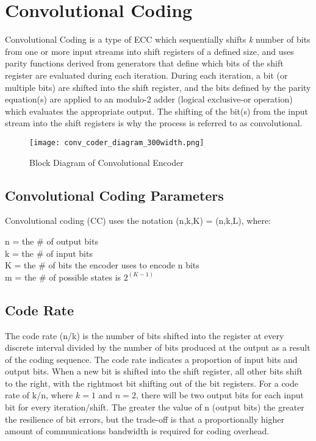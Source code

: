 \documentclass[conference]{IEEEtran}
\begin{document}
\section{Convolutional Coding}
 Convolutional Coding is a type of ECC which sequentially shifts \textit{k} number of bits from one or more input streams into shift registers of a defined size, and uses parity functions derived from generators that define which bits of the shift register are evaluated during each iteration. During each iteration, a bit (or multiple bits) are shifted into the shift register, and the bits defined by the parity equation(s) are applied to an modulo-2 adder (logical exclusive-or operation) which evaluates the appropriate output. The shifting of the bit(s) from the input stream into the shift registers is why the process is referred to as convolutional. 

 \begin{figure}[h]
\centerline{\texttt{[image: conv\_coder\_diagram\_300width.png]}}
\caption{Block Diagram of Convolutional Encoder}
\label{fig:1}
\end{figure}

 \subsection{Convolutional Coding Parameters}
 Convolutional coding (CC) uses the notation (n,k,K) = (n,k,L), where:\\
 \begin{adjustwidth}{1cm}{0cm}
    n = the \# of output bits\\
    k = the \# of input bits\\
    K = the \# of bits the encoder uses to encode n bits\\
    m = the \# of possible states is $2^{(K-1)}$
 \end{adjustwidth}

 \subsection{Code Rate}
 The code rate (n/k) is the number of bits shifted into the register at every discrete interval divided by the number of bits produced at the output as a result of the coding sequence. The code rate indicates a proportion of input bits and output bits. When a new bit is shifted into the shift register, all other bits shift to the right, with the rightmost bit shifting out of the bit registers. For a code rate of k/n, where $k=1$ and $n=2$, there will be two output bits for each input bit for every iteration/shift. The greater the value of n (output bits) the greater the resilience of bit errors, but the trade-off is that a proportionally higher amount of communications bandwidth is required for coding overhead. 
\end{document}
